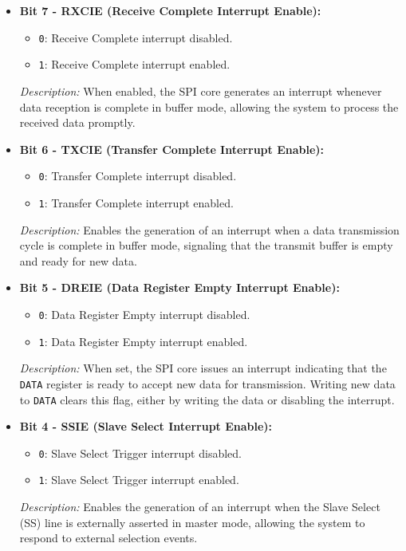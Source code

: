 \documentclass{article}
\begin{document}
\begin{itemize}
    \item \textbf{Bit 7 - RXCIE (Receive Complete Interrupt Enable):} 
    \begin{itemize}
        \item \texttt{0}: Receive Complete interrupt disabled.
        \item \texttt{1}: Receive Complete interrupt enabled.
    \end{itemize}
    \textit{Description:} When enabled, the SPI core generates an interrupt whenever data reception is complete in buffer mode, allowing the system to process the received data promptly.
    
    \item \textbf{Bit 6 - TXCIE (Transfer Complete Interrupt Enable):} 
    \begin{itemize}
        \item \texttt{0}: Transfer Complete interrupt disabled.
        \item \texttt{1}: Transfer Complete interrupt enabled.
    \end{itemize}
    \textit{Description:} Enables the generation of an interrupt when a data transmission cycle is complete in buffer mode, signaling that the transmit buffer is empty and ready for new data.
    
    \item \textbf{Bit 5 - DREIE (Data Register Empty Interrupt Enable):} 
    \begin{itemize}
        \item \texttt{0}: Data Register Empty interrupt disabled.
        \item \texttt{1}: Data Register Empty interrupt enabled.
    \end{itemize}
    \textit{Description:} When set, the SPI core issues an interrupt indicating that the \texttt{DATA} register is ready to accept new data for transmission. Writing new data to \texttt{DATA} clears this flag, either by writing the data or disabling the interrupt.
    
    \item \textbf{Bit 4 - SSIE (Slave Select Interrupt Enable):} 
    \begin{itemize}
        \item \texttt{0}: Slave Select Trigger interrupt disabled.
        \item \texttt{1}: Slave Select Trigger interrupt enabled.
    \end{itemize}
    \textit{Description:} Enables the generation of an interrupt when the Slave Select (SS) line is externally asserted in master mode, allowing the system to respond to external selection events.
    

\end{itemize}
\end{document}

